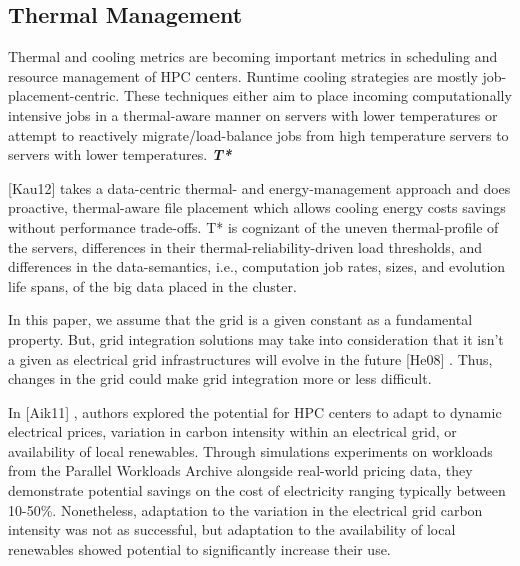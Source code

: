 \subsection{Thermal Management}
Thermal and cooling metrics are becoming important metrics in scheduling and
resource management of HPC centers. Runtime cooling strategies are mostly
job-placement-centric. These techniques either aim to place incoming
computationally intensive jobs in a thermal-aware manner on servers with
lower temperatures or attempt to reactively migrate/load-balance jobs from
high temperature servers to servers with lower temperatures.
\textbf{\textit{T* }} 

\cite{kaushik_t*:_2012}
[Kau12]
 takes a data-centric thermal- and
energy-management approach and does proactive, thermal-aware file placement
which allows cooling energy costs savings without performance trade-offs. T*
is cognizant of the uneven thermal-profile of the servers, differences in
their thermal-reliability-driven load thresholds, and differences in the
data-semantics, i.e., computation job rates, sizes, and evolution life
spans, of the big data placed in the cluster.

In this paper, we assume that the grid is a given constant as a fundamental
property. But, grid integration solutions may take into consideration that
it isn't a given as electrical grid infrastructures will evolve in the
future 
\cite{he_architecture_2008}
[He08]
. Thus, changes in the grid could make grid integration more or
less difficult.


In 
\cite{aikema_electrical_2011}
[Aik11] , authors explored the potential for HPC centers to adapt to
dynamic electrical prices, variation in carbon intensity within an
electrical grid, or availability of local renewables. Through simulations
experiments on workloads from the Parallel Workloads Archive alongside
real-world pricing data, they demonstrate potential savings on the cost of
electricity ranging typically between 10-50{\%}. Nonetheless, adaptation to
the variation in the electrical grid carbon intensity was not as successful,
but adaptation to the availability of local renewables showed potential to
significantly increase their use.
